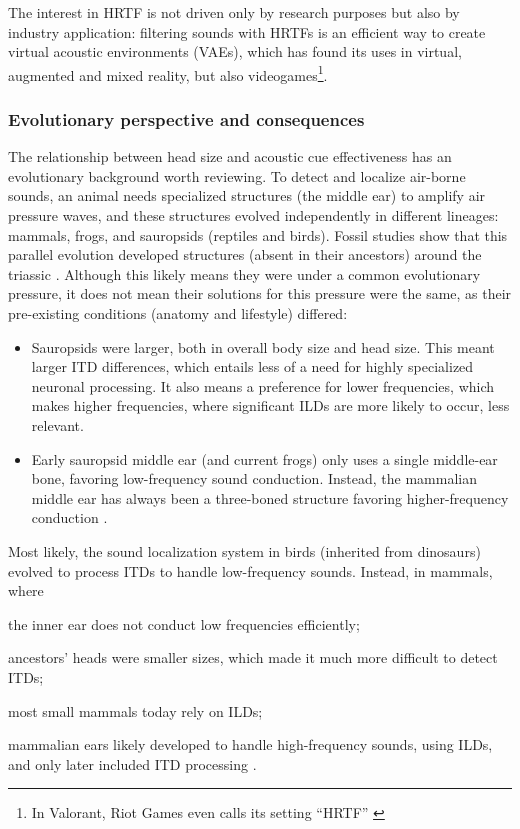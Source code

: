 \documentclass[11pt,a4paper]{article}
\begin{document}
The interest in HRTF is not driven only by research purposes but also by industry application: filtering sounds with HRTFs is an efficient way to create virtual acoustic environments (VAEs), which has found its uses in virtual, augmented and mixed reality, but also videogames\footnote{In Valorant, Riot Games even calls its setting ``HRTF'' \cite{WhatValorantsHRTF2021}}.

\subsubsection{Evolutionary perspective and consequences}

The relationship between head size and acoustic cue effectiveness has an evolutionary background worth reviewing. To detect and localize air-borne sounds, an animal needs specialized structures (the middle ear) to amplify air pressure waves, and these structures evolved independently in different lineages: mammals, frogs, and sauropsids (reptiles and birds). Fossil studies show that this parallel evolution developed structures (absent in their ancestors) around the triassic \cite{allinEvolutionMammalianMiddle1975}. Although this likely means they were under a common evolutionary pressure, it does not mean their solutions for this pressure were the same, as their pre-existing conditions (anatomy and lifestyle) differed: 
\begin{itemize}
    \item Sauropsids were larger, both in overall body size and head size. This meant larger ITD differences, which entails less of a need for highly specialized neuronal processing. It also means a preference for lower frequencies, which makes higher frequencies, where significant ILDs are more likely to occur, less relevant.
    \item Early sauropsid middle ear (and current frogs) only uses a single middle-ear bone, favoring low-frequency sound conduction. Instead, the mammalian middle ear has always been a three-boned structure favoring higher-frequency conduction \cite{manleyEvolutionaryPerspectiveMiddle2010}.
\end{itemize}
Most likely, the sound localization system in birds (inherited from dinosaurs) evolved to process ITDs to handle low-frequency sounds. Instead, in mammals, where
\begin{inlinelist}
    \item the inner ear does not conduct low frequencies efficiently;
    \item ancestors' heads were smaller sizes, which made it much more difficult to detect ITDs;
    \item most small mammals today rely on ILDs;
\end{inlinelist}
mammalian ears likely developed to handle high-frequency sounds, using ILDs, and only later included ITD processing \cite{grotheNaturalHistorySound2014}.
\end{document}
